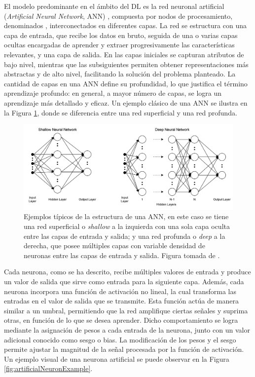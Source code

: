 El modelo predominante en el ámbito del DL es la red neuronal artificial (\textit{Artificial Neural Network}, ANN) \cite{bishop_ANN, ripley_ANN}, compuesta por nodos de procesamiento, denominados , interconectados en diferentes capas. La red se estructura con una capa de entrada, que recibe los datos en bruto, seguida de una o varias capas ocultas encargadas de aprender y extraer progresivamente las características relevantes, y una capa de salida. En las capas iniciales se capturan atributos de bajo nivel, mientras que las subsiguientes permiten obtener representaciones más abstractas y de alto nivel, facilitando la solución del problema planteado. La cantidad de capas en una ANN define su profundidad, lo que justifica el término aprendizaje profundo: en general, a mayor número de capas, se logra un aprendizaje más detallado y eficaz. Un ejemplo clásico de una ANN se ilustra en la Figura \ref{fig:annExample}, donde se diferencia entre una red superficial y una red profunda.

\begin{figure}[h]
    \centering
    \includegraphics[width=\linewidth]{figures/2_theory/neuralNetDiagram.png}
    \caption[Ejemplos de la estructura de una ANN]{Ejemplos típicos de la estructura de una ANN, en este caso se tiene una red superficial o \textit{shallow} a la izquierda con una sola capa oculta entre las capas de entrada y salida; y una red profunda o \textit{deep} a la derecha, que posee múltiples capas con variable densidad de neuronas entre las capas de entrada y salida. Figura tomada de \cite{annPictureSource}.}
    \label{fig:annExample}
\end{figure}

Cada neurona, como se ha descrito, recibe múltiples valores de entrada y produce un valor de salida que sirve como entrada para la siguiente capa. Además, cada neurona incorpora una función de activación no lineal, la cual transforma las entradas en el valor de salida que se transmite. Esta función actúa de manera similar a un umbral, permitiendo que la red amplifique ciertas señales y suprima otras, en función de lo que se desea aprender. Dicho comportamiento se logra mediante la asignación de pesos a cada entrada de la neurona, junto con un valor adicional conocido como sesgo o bias. La modificación de los pesos y el sesgo permite ajustar la magnitud de la señal procesada por la función de activación. Un ejemplo visual de una neurona artificial se puede observar en la Figura \ref{fig:artificialNeuronExample}.

